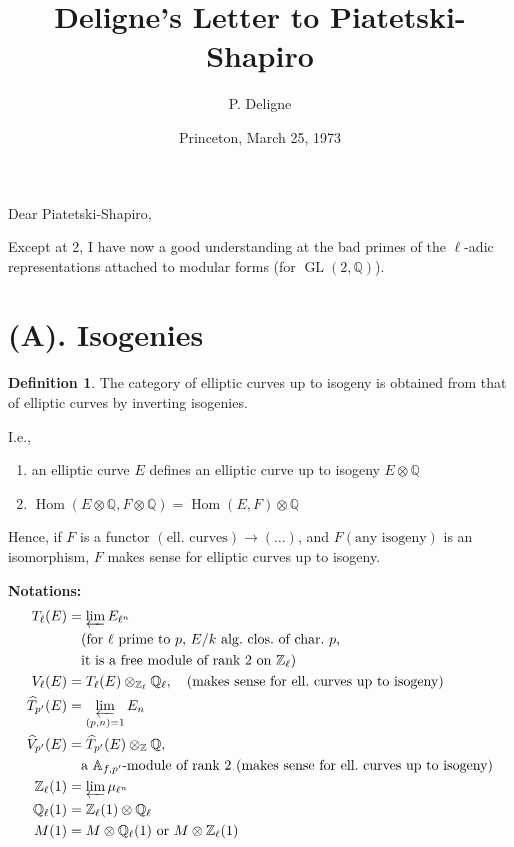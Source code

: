 \documentclass[11pt,a4paper]{article}
\title{Deligne's Letter to Piatetski-Shapiro}
\date{Princeton, March 25, 1973}
\author{P. Deligne}
\theoremstyle{plain}
\theoremstyle{definition}
\newtheorem{definition}[theorem]{Definition}
\theoremstyle{remark}
\DeclareMathOperator{\Hom}{Hom}
\DeclareMathOperator{\GL}{GL}
\newcommand{\A}{\mathbb{A}}
\newcommand{\Q}{\mathbb{Q}}
\newcommand{\Z}{\mathbb{Z}}
\newcommand{\Zl}{\mathbb{Z}_{\ell}}
\newcommand{\Ql}{\mathbb{Q}_{\ell}}
\newcommand{\Vl}{V_{\ell}}
\newcommand{\Tl}{T_{\ell}}
\begin{document}
\maketitle

\noindent
Dear Piatetski-Shapiro,

\medskip

Except at 2, I have now a good understanding at the bad primes of the $\ell$-adic representations attached to modular forms (for $\GL(2, \Q)$).

\bigskip

\section*{(A). Isogenies}

\begin{definition}
The category of elliptic curves up to isogeny is obtained from that of elliptic curves by inverting isogenies.

I.e.,
\begin{enumerate}[label=(\alph*)]
\item an elliptic curve $E$ defines an elliptic curve up to isogeny $E \otimes \Q$
\item $\Hom(E \otimes \Q, F \otimes \Q) = \Hom(E, F) \otimes \Q$
\end{enumerate}

Hence, if $F$ is a functor $(\text{ell.\ curves}) \to (\ldots)$, and $F(\text{any isogeny})$ is an isomorphism, $F$ makes sense for elliptic curves up to isogeny.
\end{definition}

\noindent
\textbf{Notations:}
\begin{align*}
\Tl(E) &= \varprojlim E_{\ell^{n}} \\
&\quad (\text{for $\ell$ prime to $p$, $E/k$ alg.\ clos.\ of char.\ $p$,} \\
&\quad \text{it is a free module of rank 2 on $\Zl$}) \\
\Vl(E) &= \Tl(E) \otimes_{\Zl} \Ql, \quad (\text{makes sense for ell.\ curves up to isogeny}) \\
\widehat{T}_{p'}(E) &= \varprojlim_{(p,n)=1} E_{n} \\
\widehat{V}_{p'}(E) &= \widehat{T}_{p'}(E) \otimes_{\Z} \Q, \\
&\quad \text{a $\A_{f,p'}$-module of rank 2 (makes sense for ell.\ curves up to isogeny)} \\
\Zl(1) &= \varprojlim \mu_{\ell^{n}} \\
\Ql(1) &= \Zl(1) \otimes \Ql \\
M(1) &= M \otimes \Ql(1) \text{ or } M \otimes \Zl(1)
\end{align*}
\end{document}
